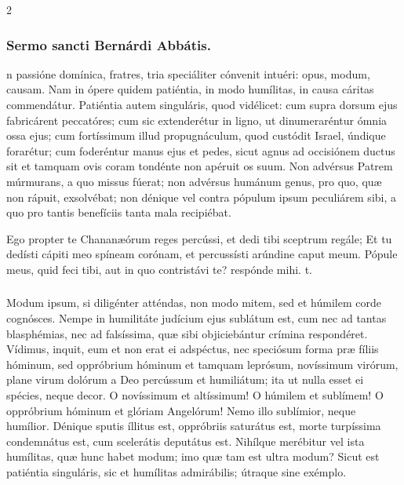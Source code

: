 \documentclass[9pt,twoside]{extarticle}
\begin{document}
\begin{multicols}{2}
\subsubsection*{\center Sermo sancti Bernárdi Abbátis.}
\begin{center}\end{center}
n passióne domínica, fratres, tria speciáliter cónvenit intuéri: opus, modum, causam. Nam in ópere quidem patiéntia, in modo humílitas, in causa cáritas commendátur. Patiéntia autem singuláris, quod vidélicet: cum supra dorsum ejus fabricárent peccatóres; cum sic extenderétur in ligno, ut dinumeraréntur ómnia ossa ejus; cum fortíssimum illud propugnáculum, quod custódit Israel, úndique forarétur; cum foderéntur manus ejus et pedes, sicut agnus ad occisiónem ductus sit et tamquam ovis coram tondénte non apéruit os suum. Non advérsus Patrem múrmurans, a quo missus fúerat; non advérsus humánum genus, pro quo, quæ non rápuit, exsolvébat; non dénique vel contra pópulum ipsum peculiárem sibi, a quo pro tantis benefíciis tanta mala recipiébat.

\begin{tightlist}{}
\item {} Ego propter te Chananæórum reges percússi, et dedi tibi sceptrum regále; \textred{*} Et tu dedísti cápiti meo spíneam corónam, et percussísti arúndine caput meum.  Pópule meus, quid feci tibi, aut in quo contristávi te? respónde mihi. t.
\end{tightlist}

\subsubsection*{\center {}}
\lettrine{M}odum ipsum, si diligénter atténdas, non modo mitem, sed et húmilem corde cognósces. Nempe in humilitáte judícium ejus sublátum est, cum nec ad tantas blasphémias, nec ad falsíssima, quæ sibi objiciebántur crímina respondéret. Vídimus, inquit, eum et non erat ei adspéctus, nec speciósum forma præ fíliis hóminum, sed oppróbrium hóminum et tamquam leprósum, novíssimum virórum, plane virum dolórum a Deo percússum et humiliátum; ita ut nulla esset ei spécies, neque decor. O novíssimum et altíssimum! O húmilem et sublímem! O oppróbrium hóminum et glóriam Angelórum! Nemo illo sublímior, neque humílior. Dénique sputis íllitus est, oppróbriis saturátus est, morte turpíssima condemnátus est, cum scelerátis deputátus est. Nihílque merébitur vel ista humílitas, quæ hunc habet modum; imo quæ tam est ultra modum? Sicut est patiéntia singuláris, sic et humílitas admirábilis; útraque sine exémplo.


\end{multicols}
\end{document}
